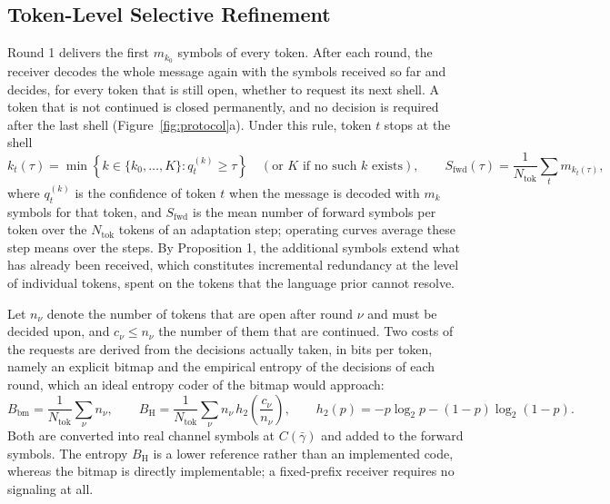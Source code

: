 \subsection{Token-Level Selective Refinement}
\label{sec:method-refinement}

Round 1 delivers the first $m_{k_0}$ symbols of every token. After each round, the receiver decodes the whole message again with the symbols received so far and decides, for every token that is still open, whether to request its next shell. A token that is not continued is closed permanently, and no decision is required after the last shell (Figure~\ref{fig:protocol}a). Under this rule, token $t$ stops at the shell
\begin{equation}
k_t(\tau) = \min\left\{k\in\{k_0,\dots,K\}: q_t^{(k)}\ge\tau\right\}\quad(\text{or } K \text{ if no such } k\text{ exists}),\qquad
S_\mathrm{fwd}(\tau) = \frac{1}{N_\mathrm{tok}}\sum_{t} m_{k_t(\tau)},
\label{eq:stop}
\end{equation}
where $q_t^{(k)}$ is the confidence of token $t$ when the message is decoded with $m_k$ symbols for that token, and $S_\mathrm{fwd}$ is the mean number of forward symbols per token over the $N_\mathrm{tok}$ tokens of an adaptation step; operating curves average these step means over the steps. By Proposition 1, the additional symbols extend what has already been received, which constitutes incremental redundancy at the level of individual tokens, spent on the tokens that the language prior cannot resolve.

Let $n_\nu$ denote the number of tokens that are open after round $\nu$ and must be decided upon, and $c_\nu\le n_\nu$ the number of them that are continued. Two costs of the requests are derived from the decisions actually taken, in bits per token, namely an explicit bitmap and the empirical entropy of the decisions of each round, which an ideal entropy coder of the bitmap would approach:
\begin{equation}
B_\mathrm{bm} = \frac{1}{N_\mathrm{tok}}\sum_{\nu} n_\nu,\qquad
B_\mathrm{H} = \frac{1}{N_\mathrm{tok}}\sum_{\nu} n_\nu\,h_2\!\left(\frac{c_\nu}{n_\nu}\right),\qquad
h_2(p) = -p\log_2 p-(1-p)\log_2(1-p).
\label{eq:feedback}
\end{equation}
Both are converted into real channel symbols at $C(\bar{\gamma})$ and added to the forward symbols. The entropy $B_\mathrm{H}$ is a lower reference rather than an implemented code, whereas the bitmap is directly implementable; a fixed-prefix receiver requires no signaling at all.

